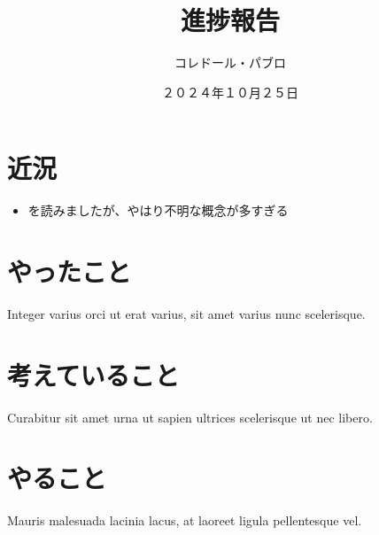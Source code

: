 \documentclass[a4paper, 12pt]{article}
\title{進捗報告}
\author{コレドール・パブロ}
\date{２０２４年１０月２５日}
\begin{document}
\maketitle

\section*{近況}
\begin{itemize}
\item \cite{DDSP}を読みましたが、やはり不明な概念が多すぎる
\end{itemize} 

\section*{やったこと}
Integer varius orci ut erat varius, sit amet varius nunc scelerisque.

\section*{考えていること}
Curabitur sit amet urna ut sapien ultrices scelerisque ut nec libero.

\section*{やること}
Mauris malesuada lacinia lacus, at laoreet ligula pellentesque vel.



\end{document}
